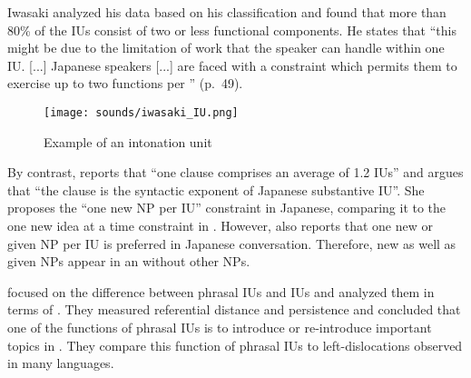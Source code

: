 Iwasaki analyzed his data based on his classification and
found that more than 80\% of the IUs consist of
two or less functional components.
He states that
``this might be due to the limitation of work that the speaker can handle within one IU. [...] Japanese speakers [...] are faced with a constraint which permits them to exercise up to two functions per '' (p.~49).


\begin{figure}
 \centering
 \texttt{[image: sounds/iwasaki\_IU.png]}
 \caption{Example of an intonation unit \cite[109]{iwasaki08}}
 \label{IUExF}
\end{figure}


By contrast,  reports that
``one clause comprises an average of 1.2 IUs''
and argues that
``the clause is the syntactic exponent of Japanese substantive IU''.
She proposes the ``one new NP per IU'' constraint in Japanese,
comparing it to the one new idea at a time constraint in .
However,  also reports that
one new or given NP per IU is preferred in Japanese conversation.
Therefore,
new as well as given NPs appear in an 
without other NPs.




 focused on the difference between
phrasal IUs and  IUs and
analyzed them in terms of .
They measured referential distance and persistence \cite{givon83} and concluded that
one of the functions of phrasal IUs is to introduce or re-introduce
important topics in .
They compare this function of phrasal IUs to left-dislocations observed in many languages.

%



